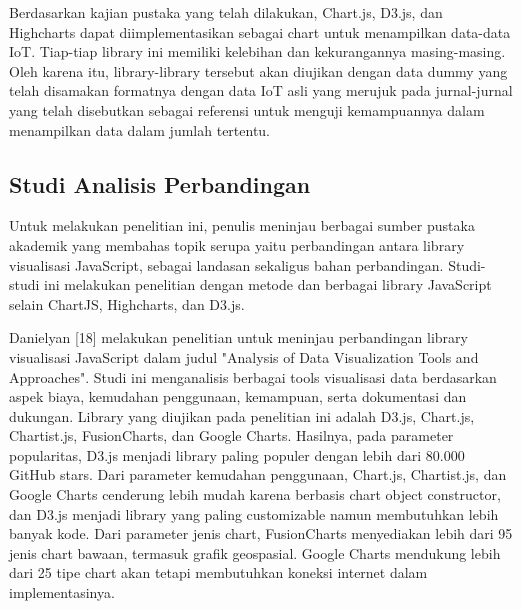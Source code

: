Berdasarkan kajian pustaka yang telah dilakukan, Chart.js, D3.js, dan Highcharts dapat diimplementasikan sebagai chart untuk menampilkan data-data IoT. Tiap-tiap library ini memiliki kelebihan dan kekurangannya masing-masing. Oleh karena itu, library-library tersebut akan diujikan dengan data dummy yang telah disamakan formatnya dengan data IoT asli yang merujuk pada jurnal-jurnal yang telah disebutkan sebagai referensi untuk menguji kemampuannya dalam menampilkan data dalam jumlah tertentu. 

\subsection{Studi Analisis Perbandingan}
Untuk melakukan penelitian ini, penulis meninjau berbagai sumber pustaka akademik yang membahas topik serupa yaitu perbandingan antara library visualisasi JavaScript, sebagai landasan sekaligus bahan perbandingan. Studi-studi ini melakukan penelitian dengan metode dan berbagai library JavaScript selain ChartJS, Highcharts, dan D3.js. 

Danielyan [18] melakukan penelitian untuk meninjau perbandingan library visualisasi JavaScript dalam judul "Analysis of Data Visualization Tools and Approaches". Studi ini menganalisis berbagai tools visualisasi data berdasarkan aspek biaya, kemudahan penggunaan, kemampuan, serta dokumentasi dan dukungan. Library yang diujikan pada penelitian ini adalah D3.js, Chart.js, Chartist.js, FusionCharts, dan Google Charts. Hasilnya, pada  parameter popularitas,  D3.js menjadi library paling populer dengan lebih dari 80.000 GitHub stars. Dari parameter kemudahan penggunaan, Chart.js, Chartist.js, dan Google Charts cenderung lebih mudah karena berbasis chart object constructor, dan D3.js menjadi library yang paling customizable namun membutuhkan lebih banyak kode. Dari parameter jenis chart, FusionCharts menyediakan lebih dari 95 jenis chart bawaan, termasuk grafik geospasial. Google Charts mendukung lebih dari 25 tipe chart akan tetapi membutuhkan koneksi internet dalam implementasinya. 

